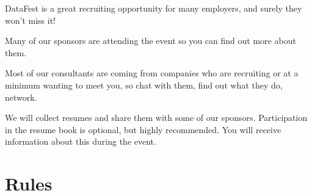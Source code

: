 \documentclass[]{article}
\begin{document}
DataFest is a great recruiting opportunity for many employers, and
surely they won't miss it!

Many of our sponsors are attending the event so you can find out more
about them.

Most of our consultants are coming from companies who are recruiting or
at a minimum wanting to meet you, so chat with them, find out what they
do, network.

We will collect resumes and share them with some of our sponsors.
Participation in the resume book is optional, but highly recommended.
You will receive information about this during the event.

\hypertarget{rules}{%
\section{Rules}\label{rules}}
\end{document}
